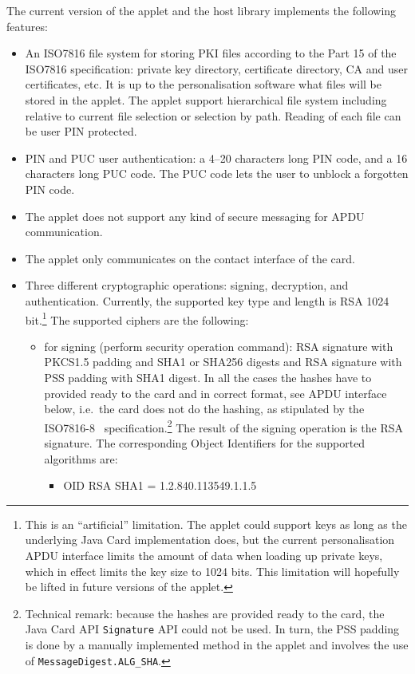 \documentclass{article}
\begin{document}
The current version of the applet and the host library implements the
following features:
\begin{itemize}
\item An ISO7816 file system for storing PKI files according to the Part 15
of the ISO7816 specification: private key directory, certificate directory, CA and user certificates, etc.
It is up to the personalisation software what files will be stored in the applet.
The applet support hierarchical file system including relative to current file selection or
selection by path. Reading of each file can be user PIN protected.
\item PIN and PUC user authentication: a 4--20 characters long PIN code, and a 16 characters
long PUC code. The PUC code lets the user to unblock a forgotten PIN code.
\item The applet does not support any kind of secure messaging for APDU communication.
\item The applet only communicates on the contact interface of the card.
\item Three different cryptographic operations: signing, decryption, and authentication.
Currently, the supported key type and length is RSA 1024 bit.\footnote{This is an ``artificial'' limitation.
The applet could support
keys as long as the underlying Java Card implementation does, but the current personalisation APDU interface limits the 
amount of data when loading up private keys, which in effect limits the key size to 1024 bits. This limitation will
hopefully be lifted in future versions of the applet.} The supported ciphers are the following:
\begin{itemize}
\item for signing (perform security operation command): RSA signature with PKCS1.5 padding and SHA1 or SHA256 digests and RSA signature 
with PSS padding with SHA1 digest.
In all the cases the hashes have to provided ready to the card and in correct format, see APDU interface below,
i.e.\ the card does not do the hashing, as stipulated by the ISO7816-8~\cite{?} specification.\footnote{%
Technical remark: because the hashes are provided ready to the card, the Java Card API \texttt{Signature} API
could not be used. In turn, the PSS padding is done by a manually implemented method in the applet and involves the 
use of \texttt{MessageDigest.ALG\_SHA}.} The result of the signing operation is the RSA signature.
The corresponding Object Identifiers
for the supported algorithms are:
\begin{itemize}
\item OID RSA SHA1 = 1.2.840.113549.1.1.5

\end{itemize}
\end{itemize}
\end{itemize}
\end{document}
